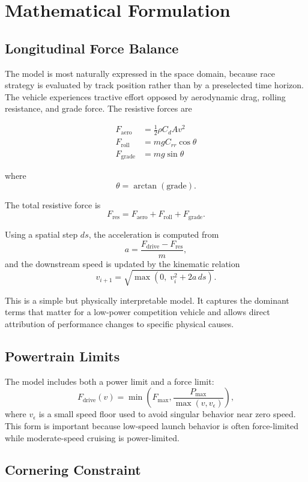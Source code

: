\documentclass[11pt]{article}
\begin{document}
\section{Mathematical Formulation}

\subsection{Longitudinal Force Balance}

The model is most naturally expressed in the space domain, because race strategy is evaluated by track position rather than by a preselected time horizon. The vehicle experiences tractive effort opposed by aerodynamic drag, rolling resistance, and grade force. The resistive forces are

\begin{align}
F_{\mathrm{aero}} &= \frac{1}{2}\rho C_dA v^2 \\
F_{\mathrm{roll}} &= mgC_{rr}\cos\theta \\
F_{\mathrm{grade}} &= mg\sin\theta
\end{align}

where
\[
\theta = \arctan(\mathrm{grade}).
\]

The total resistive force is
\[
F_{\mathrm{res}} = F_{\mathrm{aero}} + F_{\mathrm{roll}} + F_{\mathrm{grade}}.
\]

Using a spatial step \(ds\), the acceleration is computed from
\[
a = \frac{F_{\mathrm{drive}} - F_{\mathrm{res}}}{m},
\]
and the downstream speed is updated by the kinematic relation
\[
v_{i+1} = \sqrt{\max\left(0,\; v_i^2 + 2a\,ds\right)}.
\]

This is a simple but physically interpretable model. It captures the dominant terms that matter for a low-power competition vehicle and allows direct attribution of performance changes to specific physical causes.

\subsection{Powertrain Limits}

The model includes both a power limit and a force limit:
\[
F_{\mathrm{drive}}(v) = \min\left(F_{\max}, \frac{P_{\max}}{\max(v, v_\epsilon)}\right),
\]
where \(v_\epsilon\) is a small speed floor used to avoid singular behavior near zero speed. This form is important because low-speed launch behavior is often force-limited while moderate-speed cruising is power-limited.

\subsection{Cornering Constraint}
\end{document}
